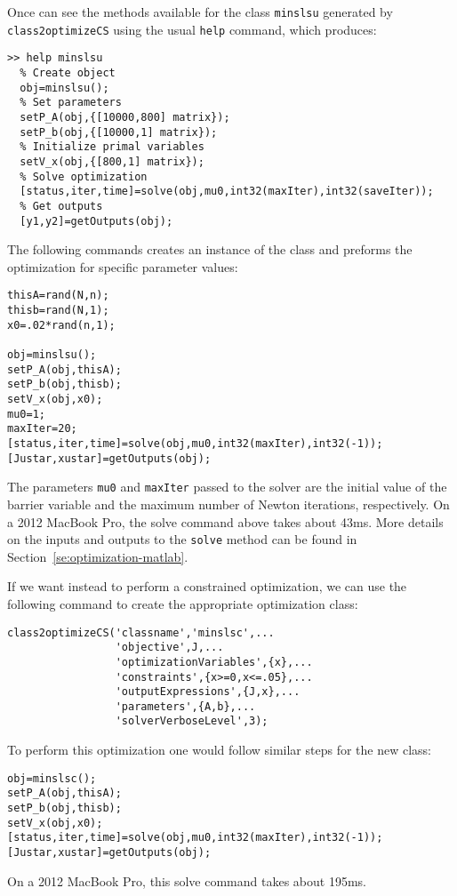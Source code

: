 \documentclass[11pt]{article}
\theoremstyle{remark}
\begin{document}
\medskip

Once can see the methods available for the class \lstinline{minslsu}
generated by \lstinline{class2optimizeCS} using the usual
\lstinline{help} command, which produces:
\begin{lstlisting}
>> help minslsu
  % Create object
  obj=minslsu();
  % Set parameters
  setP_A(obj,{[10000,800] matrix});
  setP_b(obj,{[10000,1] matrix});
  % Initialize primal variables
  setV_x(obj,{[800,1] matrix});
  % Solve optimization
  [status,iter,time]=solve(obj,mu0,int32(maxIter),int32(saveIter));
  % Get outputs
  [y1,y2]=getOutputs(obj);
\end{lstlisting}

\medskip

The following commands creates an instance of the class and preforms
the optimization for specific parameter values:
\begin{lstlisting}
thisA=rand(N,n);
thisb=rand(N,1);
x0=.02*rand(n,1);

obj=minslsu();
setP_A(obj,thisA);
setP_b(obj,thisb);
setV_x(obj,x0);
mu0=1;
maxIter=20;
[status,iter,time]=solve(obj,mu0,int32(maxIter),int32(-1));
[Justar,xustar]=getOutputs(obj);
\end{lstlisting}
The parameters \lstinline{mu0} and \lstinline{maxIter} passed to the
solver are the initial value of the barrier variable and the maximum
number of Newton iterations, respectively. On a 2012 MacBook Pro, the
solve command above takes about 43ms. More details on the inputs and
outputs to the \lstinline{solve} method can be found in
Section~\ref{se:optimization-matlab}.

\medskip

If we want instead to perform a constrained optimization, we can use
the following command to create the appropriate optimization class:
\begin{lstlisting}
class2optimizeCS('classname','minslsc',...
                 'objective',J,...
                 'optimizationVariables',{x},...
                 'constraints',{x>=0,x<=.05},...
                 'outputExpressions',{J,x},...
                 'parameters',{A,b},...
                 'solverVerboseLevel',3);
\end{lstlisting}
To perform this optimization one would follow similar steps for the
new class:
\begin{lstlisting}
obj=minslsc();
setP_A(obj,thisA);
setP_b(obj,thisb);
setV_x(obj,x0);
[status,iter,time]=solve(obj,mu0,int32(maxIter),int32(-1));
[Justar,xustar]=getOutputs(obj);
\end{lstlisting}
On a 2012 MacBook Pro, this solve command  takes about 195ms.
\end{document}
